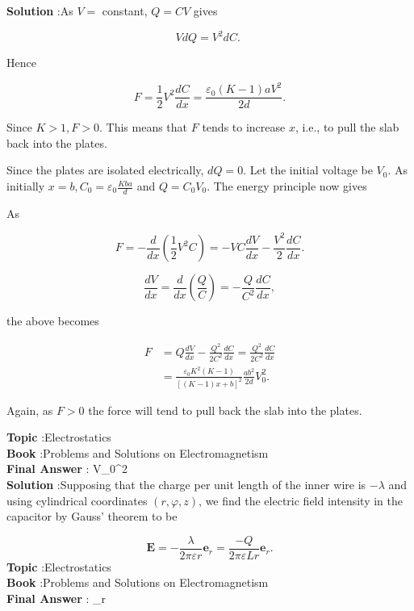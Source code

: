 \documentclass[10pt]{article}
\begin{document}
\textbf{Solution} :As $V=$ constant, $Q=C V$ gives

$$
V d Q=V^{2} d C \text {. }
$$

Hence

$$
F=\frac{1}{2} V^{2} \frac{d C}{d x}=\frac{\varepsilon_{0}(K-1) a V^{2}}{2 d} .
$$

Since $K>1, F>0$. This means that $F$ tends to increase $x$, i.e., to pull the slab back into the plates.

 Since the plates are isolated electrically, $d Q=0$. Let the initial voltage be $V_{0}$. As initially $x=b, C_{0}=\varepsilon_{0} \frac{K b a}{d}$ and $Q=C_{0} V_{0}$. The energy principle now gives

As

$$
F=-\frac{d}{d x}\left(\frac{1}{2} V^{2} C\right)=-V C \frac{d V}{d x}-\frac{V^{2}}{2} \frac{d C}{d x} .
$$

$$
\frac{d V}{d x}=\frac{d}{d x}\left(\frac{Q}{C}\right)=-\frac{Q}{C^{2}} \frac{d C}{d x},
$$

the above becomes

$$
\begin{aligned}
F &=Q \frac{d V}{d x}-\frac{Q^{2}}{2 C^{2}} \frac{d C}{d x}=\frac{Q^{2}}{2 C^{2}} \frac{d C}{d x} \\
&=\frac{\varepsilon_{0} K^{2}(K-1)}{[(K-1) x+b]^{2}} \frac{a b^{2}}{2 d} V_{0}^{2} .
\end{aligned}
$$

Again, as $F>0$ the force will tend to pull back the slab into the plates.


\textbf{Topic} :Electrostatics\\
\textbf{Book} :Problems and Solutions on Electromagnetism\\
\textbf{Final Answer} :  V_{0}^{2}\\


\textbf{Solution} :Supposing that the charge per unit length of the inner wire is $-\lambda$ and using cylindrical coordinates $(r, \varphi, z)$, we find the electric field intensity in the capacitor by Gauss' theorem to be

$$
\mathbf{E}=-\frac{\lambda}{2 \pi \varepsilon r} \mathbf{e}_{r}=\frac{-Q}{2 \pi \varepsilon L r} \mathbf{e}_{r} .
$$
\textbf{Topic} :Electrostatics\\
\textbf{Book} :Problems and Solutions on Electromagnetism\\
\textbf{Final Answer} : _{r}\\
\end{document}
